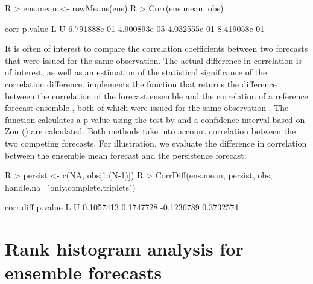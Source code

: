 \documentclass[article]{jss}
\begin{document}
\begin{Schunk}
\begin{Sinput}
R > ens.mean <- rowMeans(ens)
R > Corr(ens.mean, obs)
\end{Sinput}
\begin{Soutput}
        corr      p.value            L            U 
6.791888e-01 4.900893e-05 4.032555e-01 8.419058e-01 
\end{Soutput}
\end{Schunk}


It is often of interest to compare the correlation coefficients between two forecasts that were issued for the same observation.
The actual difference in correlation is of interest, as well as an estimation of the statistical significance of the correlation difference.
 implements the function  that returns the difference between the correlation of the forecast ensemble  and the correlation of a reference forecast ensemble , both of which were issued for the same observation .
The function calculates a p-value using the test by \citet{steiger1980tests} and a confidence interval based on Zou (\citet{zou2007toward}) are calculated.
Both methods take into account correlation between the two competing forecasts.
For illustration, we evaluate the difference in correlation between the ensemble mean forecast and the persistence forecast:


\begin{Schunk}
\begin{Sinput}
R > persist <- c(NA, obs[1:(N-1)])
R > CorrDiff(ens.mean, persist, obs, handle.na="only.complete.triplets")
\end{Sinput}
\begin{Soutput}
 corr.diff    p.value          L          U 
 0.1057413  0.1747728 -0.1236789  0.3732574 
\end{Soutput}
\end{Schunk}




\section{Rank histogram analysis for ensemble forecasts}
\end{document}
